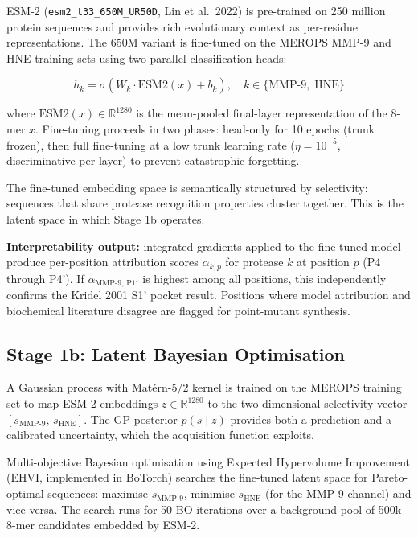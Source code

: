 \documentclass[10pt,a4paper]{article}
\newcommand{\seq}[1]{\texttt{#1}}
\begin{document}
ESM-2 (\seq{esm2\_t33\_650M\_UR50D}, Lin et al.\ 2022) is pre-trained on
250 million protein sequences and provides rich evolutionary context as
per-residue representations.  The 650M variant is fine-tuned on the MEROPS
MMP-9 and HNE training sets using two parallel classification heads:

\begin{equation}
  h_k = \sigma\!\left(W_k \cdot \overline{\mathrm{ESM2}}(x) + b_k\right),
  \quad k \in \{\text{MMP-9},\;\text{HNE}\}
\end{equation}

where $\overline{\mathrm{ESM2}}(x) \in \mathbb{R}^{1280}$ is the mean-pooled
final-layer representation of the 8-mer $x$.  Fine-tuning proceeds in two
phases: head-only for 10 epochs (trunk frozen), then full fine-tuning at a
low trunk learning rate ($\eta = 10^{-5}$, discriminative per layer) to
prevent catastrophic forgetting.

The fine-tuned embedding space is semantically structured by selectivity:
sequences that share protease recognition properties cluster together.
This is the latent space in which Stage 1b operates.

\textbf{Interpretability output:} integrated gradients applied to the
fine-tuned model produce per-position attribution scores
$\alpha_{k,p}$ for protease $k$ at position $p$ (P4 through P4').
If $\alpha_{\text{MMP-9},\,\text{P1}'}$ is highest among all positions,
this independently confirms the Kridel 2001 S1' pocket result.
Positions where model attribution and biochemical literature disagree
are flagged for point-mutant synthesis.

\subsection{Stage 1b: Latent Bayesian Optimisation}

A Gaussian process with Mat\'{e}rn-5/2 kernel is trained on the MEROPS
training set to map ESM-2 embeddings $z \in \mathbb{R}^{1280}$ to the
two-dimensional selectivity vector
$[s_{\text{MMP-9}},\, s_{\text{HNE}}]$.
The GP posterior $p(s \mid z)$ provides both a prediction and a
calibrated uncertainty, which the acquisition function exploits.

Multi-objective Bayesian optimisation using Expected Hypervolume
Improvement (EHVI, implemented in BoTorch) searches the fine-tuned
latent space for Pareto-optimal sequences: maximise $s_{\text{MMP-9}}$,
minimise $s_{\text{HNE}}$ (for the MMP-9 channel) and vice versa.
The search runs for 50 BO iterations over a background pool of 500k
8-mer candidates embedded by ESM-2.
\end{document}
